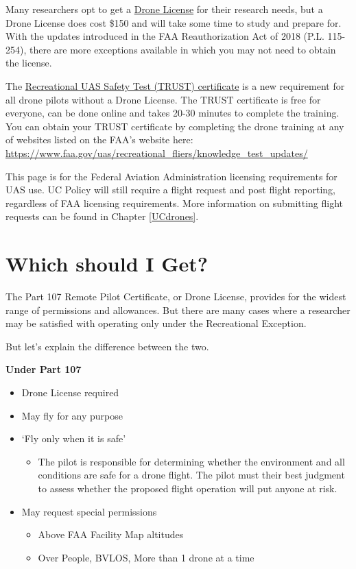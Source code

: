 \documentclass[
  12pt,
]{book}
\providecommand{\tightlist}{%
  \setlength{\itemsep}{0pt}\setlength{\parskip}{0pt}}
\newenvironment{notebox}{
  \definecolor{shadecolor}{gray}{.8}  %
  \color{black}
  \begin{shaded}}
 {\end{shaded}}
\begin{document}
Many researchers opt to get a \protect\hyperlink{get-license}{Drone License} for their research needs, but a Drone License does cost \$150 and will take some time to study and prepare for. With the updates introduced in the FAA Reauthorization Act of 2018 (P.L. 115-254), there are more exceptions available in which you may not need to obtain the license.

The \protect\hyperlink{TRUST}{Recreational UAS Safety Test (TRUST) certificate} is a new requirement for all drone pilots without a Drone License. The TRUST certificate is free for everyone, can be done online and takes 20-30 minutes to complete the training. You can obtain your TRUST certificate by completing the drone training at any of websites listed on the FAA's website here: \url{https://www.faa.gov/uas/recreational_fliers/knowledge_test_updates/}

\begin{notebox}
This page is for the Federal Aviation Administration licensing requirements for UAS use. UC Policy will still require a flight request and post flight reporting, regardless of FAA licensing requirements. More information on submitting flight requests can be found in Chapter \ref{UCdrones}.

\end{notebox}

\hypertarget{difference}{%
\section{Which should I Get?}\label{difference}}

The Part 107 Remote Pilot Certificate, or Drone License, provides for the widest range of permissions and allowances. But there are many cases where a researcher may be satisfied with operating only under the Recreational Exception.

But let's explain the difference between the two.

\textbf{Under Part 107}

\begin{itemize}
\tightlist
\item
  Drone License required
\item
  May fly for any purpose
\item
  `Fly only when it is safe'

  \begin{itemize}
  \tightlist
  \item
    The pilot is responsible for determining whether the environment and all conditions are safe for a drone flight. The pilot must their best judgment to assess whether the proposed flight operation will put anyone at risk.
  \end{itemize}
\item
  May request special permissions

  \begin{itemize}
  \tightlist
  \item
    Above FAA Facility Map altitudes
  \item
    Over People, BVLOS, More than 1 drone at a time
  \end{itemize}
\end{itemize}
\end{document}
